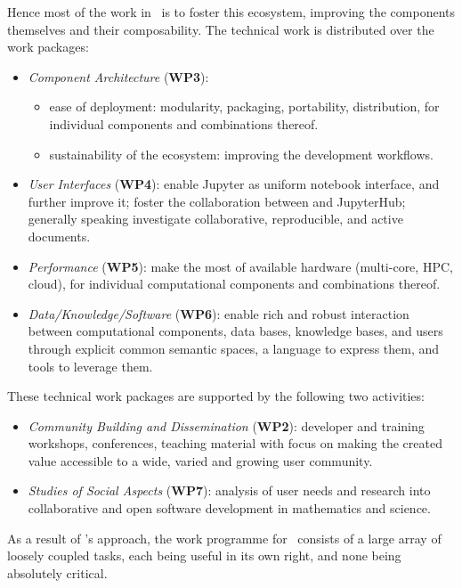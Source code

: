 Hence most of the work in \ODK\ is to foster this ecosystem, improving
the components themselves and their composability. The technical work is
distributed over the work packages:
\begin{itemize}
\item \emph{Component Architecture} (\textbf{WP3}):
  \begin{itemize}
  \item ease of deployment: modularity, packaging, portability,
    distribution, for individual components and combinations thereof.
  \item sustainability of the ecosystem: improving the development workflows.
  \end{itemize}
\item \emph{User Interfaces} (\textbf{WP4}): enable Jupyter as uniform notebook
  interface, and further improve it; foster the collaboration between
  \cocalc and JupyterHub; generally speaking investigate
  collaborative, reproducible, and active documents.
\item \emph{Performance} (\textbf{WP5}): make the most of available hardware
  (multi-core, HPC, cloud), for individual computational components and
  combinations thereof.
\item \emph{Data/Knowledge/Software} (\textbf{WP6}): enable rich and robust
  interaction between computational components, data bases, knowledge
  bases, and users through explicit common semantic spaces, a language to
  express them, and tools to leverage them.
\end{itemize}
These technical work packages are supported by the following two activities:
\begin{itemize}
\item \emph{Community Building and Dissemination} (\textbf{WP2}): developer and
  training workshops, conferences, teaching material with focus on
  making the created value accessible to a wide, varied and growing user community.
\item \emph{Studies of Social Aspects} (\textbf{WP7}): analysis of user needs and
  research into collaborative and open software development in
  mathematics and science.
\end{itemize}

As a result of \ODK's approach, the work programme for \ODK\ consists
of a large array of loosely coupled tasks, each being useful in its
own right, and none being absolutely critical.

